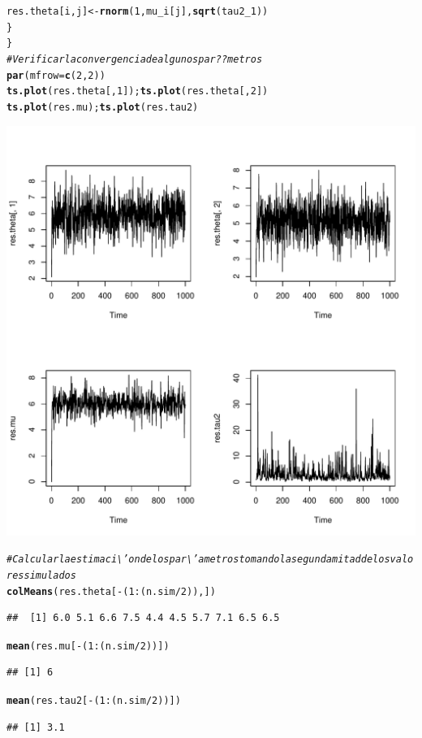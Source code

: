 \documentclass[10pt,openright]{book}\usepackage[]{graphicx}\usepackage[]{color}
\makeatletter
\def\maxwidth{ %
  \ifdim\Gin@nat@width>\linewidth
    \linewidth
  \else
    \Gin@nat@width
  \fi
}
\newcommand{\hlnum}[1]{\textcolor[rgb]{0.686,0.059,0.569}{#1}}%
\newcommand{\hlcom}[1]{\textcolor[rgb]{0.678,0.584,0.686}{\textit{#1}}}%
\newcommand{\hlopt}[1]{\textcolor[rgb]{0,0,0}{#1}}%
\newcommand{\hlstd}[1]{\textcolor[rgb]{0.345,0.345,0.345}{#1}}%
\newcommand{\hlkwb}[1]{\textcolor[rgb]{0.69,0.353,0.396}{#1}}%
\newcommand{\hlkwc}[1]{\textcolor[rgb]{0.333,0.667,0.333}{#1}}%
\newcommand{\hlkwd}[1]{\textcolor[rgb]{0.737,0.353,0.396}{\textbf{#1}}}%
\newenvironment{kframe}{%
 \def\at@end@of@kframe{}%
 \ifinner\ifhmode%
  \def\at@end@of@kframe{\end{minipage}}%
  \begin{minipage}{\columnwidth}%
 \fi\fi%
 \def\FrameCommand##1{\hskip\@totalleftmargin \hskip-\fboxsep
 \colorbox{shadecolor}{##1}\hskip-\fboxsep
     \hskip-\linewidth \hskip-\@totalleftmargin \hskip\columnwidth}%
 \MakeFramed {\advance\hsize-\width
   \@totalleftmargin\z@ \linewidth\hsize
   \@setminipage}}%
 {\par\unskip\endMakeFramed%
 \at@end@of@kframe}
\newenvironment{knitrout}{}{} %
\makeatother
\begin{document}
\begin{knitrout}
\begin{kframe}
\begin{alltt}
    \hlstd{res.theta[i,j]} \hlkwb{<-} \hlkwd{rnorm}\hlstd{(}\hlnum{1}\hlstd{, mu_i[j],} \hlkwd{sqrt}\hlstd{(tau2_1))}
  \hlstd{\}}
\hlstd{\}}
 \hlcom{# Verificar la convergencia de algunos par??metros}
 \hlkwd{par}\hlstd{(}\hlkwc{mfrow}\hlstd{=}\hlkwd{c}\hlstd{(}\hlnum{2}\hlstd{,}\hlnum{2}\hlstd{))}
 \hlkwd{ts.plot}\hlstd{(res.theta[,}\hlnum{1}\hlstd{]);} \hlkwd{ts.plot}\hlstd{(res.theta[,}\hlnum{2}\hlstd{])}
 \hlkwd{ts.plot}\hlstd{(res.mu);} \hlkwd{ts.plot}\hlstd{(res.tau2)}
\end{alltt}
\end{kframe}
\includegraphics[width=\maxwidth]{figure/unnamed-chunk-75-1} 
\begin{kframe}\begin{alltt}
 \hlcom{# Calcular la estimaci\textbackslash{}'on de los par\textbackslash{}'ametros tomando la segunda mitad de los valores simulados}
 \hlkwd{colMeans}\hlstd{(res.theta[}\hlopt{-}\hlstd{(}\hlnum{1}\hlopt{:}\hlstd{(n.sim}\hlopt{/}\hlnum{2}\hlstd{)),])}
\end{alltt}
\begin{verbatim}
##  [1] 6.0 5.1 6.6 7.5 4.4 4.5 5.7 7.1 6.5 6.5
\end{verbatim}
\begin{alltt}
 \hlkwd{mean}\hlstd{(res.mu[}\hlopt{-}\hlstd{(}\hlnum{1}\hlopt{:}\hlstd{(n.sim}\hlopt{/}\hlnum{2}\hlstd{))])}
\end{alltt}
\begin{verbatim}
## [1] 6
\end{verbatim}
\begin{alltt}
 \hlkwd{mean}\hlstd{(res.tau2[}\hlopt{-}\hlstd{(}\hlnum{1}\hlopt{:}\hlstd{(n.sim}\hlopt{/}\hlnum{2}\hlstd{))])}
\end{alltt}
\begin{verbatim}
## [1] 3.1
\end{verbatim}
\end{kframe}
\end{knitrout}
\end{document}
